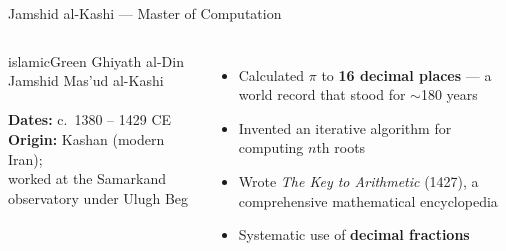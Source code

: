 \begin{frame}[shrink=18]{Jamshid al-Kashi --- Master of Computation}
  \begin{columns}[T]
    \begin{personbox}{islamicGreen}
      {\small Ghiyath al-Din Jamshid Mas'ud al-Kashi\\
      }\\[3pt]
      \textbf{Dates:} c.\ 1380 -- 1429 CE\\
      \textbf{Origin:} Kashan (modern Iran);\\
      worked at the Samarkand observatory under Ulugh Beg
    \end{personbox}
    \vspace{0.3em}
    \begin{itemize}
      \item Calculated $\pi$ to \textbf{16 decimal places} --- a world record that stood for $\sim$180 years
      \item Invented an iterative algorithm for computing $n$th roots
      \item Wrote \textit{The Key to Arithmetic} (1427), a comprehensive mathematical encyclopedia
      \item Systematic use of \textbf{decimal fractions}
    \end{itemize}


    \vspace{0.6em}
  \end{columns}

\end{frame}

